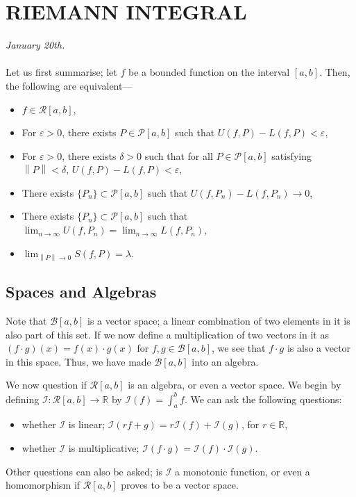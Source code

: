 \documentclass[15pt,a4paper]{book}
\theoremstyle{definition}
\newcommand{\R}{\mathbb{R}} %
\newcommand{\cP}{\mathcal{P}}
\newcommand{\cR}{\mathcal{R}}
\newcommand{\cB}{\mathcal{B}}
\newcommand{\cI}{\mathcal{I}}
\newcommand{\norm}[1]{\left\lVert#1\right\rVert}
\begin{document}
\chapter{RIEMANN INTEGRAL}
\textit{January 20th.}\\ \\
Let us first summarise; let $f$ be a bounded function on the interval $[a,b]$. Then, the following are equivalent---
\begin{itemize}
    \item $f \in \cR[a,b]$,
    \item For $\varepsilon > 0$, there exists $P \in \cP[a,b]$ such that $U(f,P)-L(f,P) < \varepsilon$,
    \item For $\varepsilon > 0$, there exists $\delta > 0$ such that for all $P \in \cP[a,b]$ satisfying $\norm{P} < \delta$, $U(f,P)-L(f,P) < \varepsilon$,
    \item There exists $\{P_{n}\} \subset \cP[a,b]$ such that $U(f,P_{n})-L(f,P_{n}) \to 0$,
    \item There exists $\{P_{n}\} \subset \cP[a,b]$ such that $\lim_{n \to \infty} U(f,P_{n}) = \lim_{n \to \infty} L(f,P_{n})$,
    \item $\lim_{\norm{P} \to 0} S(f,P) = \lambda$.
\end{itemize}

\section{Spaces and Algebras}
Note that $\cB[a,b]$ is a vector space; a linear combination of two elements in it is also part of this set. If we now define a multiplication of two vectors in it as $(f \cdot g)(x) = f(x) \cdot g(x)$ for $f,g \in \cB[a,b]$, we see that $f \cdot g$ is also a vector in this space. Thus, we have made $\cB[a,b]$ into an algebra.

We now question if $\cR[a,b]$ is an algebra, or even a vector space. We begin by defining $\cI: \cR[a,b] \to \R$ by $\cI (f) = \int_{a}^{b} f$. We can ask the following questions:
\begin{itemize}
    \item whether $\cI$ is linear; $\cI(rf+g) = r\cI(f) + \cI(g)$, for $r \in \R$,
    \item whether $\cI$ is multiplicative; $\cI(f \cdot g) = \cI(f) \cdot \cI(g)$.
\end{itemize}
Other questions can also be asked; is $\cI$ a monotonic function, or even a homomorphism if $\cR[a,b]$ proves to be a vector space.\\
\end{document}
